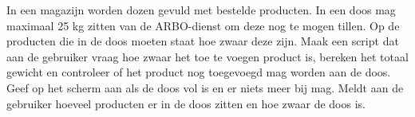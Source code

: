 In een magazijn worden dozen gevuld met bestelde producten. In een doos mag maximaal 25 kg zitten van de ARBO-dienst om deze nog te mogen tillen. Op de producten die in de doos moeten staat hoe zwaar deze zijn. Maak een script dat aan de gebruiker vraag hoe zwaar het toe te voegen product is, bereken het totaal gewicht en controleer of het product nog toegevoegd mag worden aan de doos. Geef op het scherm aan als de doos vol is en er niets meer bij mag. Meldt aan de gebruiker hoeveel producten er in de doos zitten en hoe zwaar de doos is.


